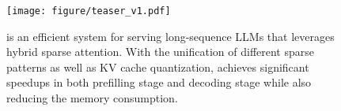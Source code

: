
\begin{figure}[t]
    \centering
    \texttt{[image: figure/teaser\_v1.pdf]}
    \caption{\system is an efficient system for serving long-sequence LLMs that leverages hybrid sparse attention. With the unification of different sparse patterns as well as KV cache quantization, \system achieves significant speedups in both prefilling stage and decoding stage while also reducing the memory consumption.} %
    \label{fig:intro:teaser}
\end{figure}
